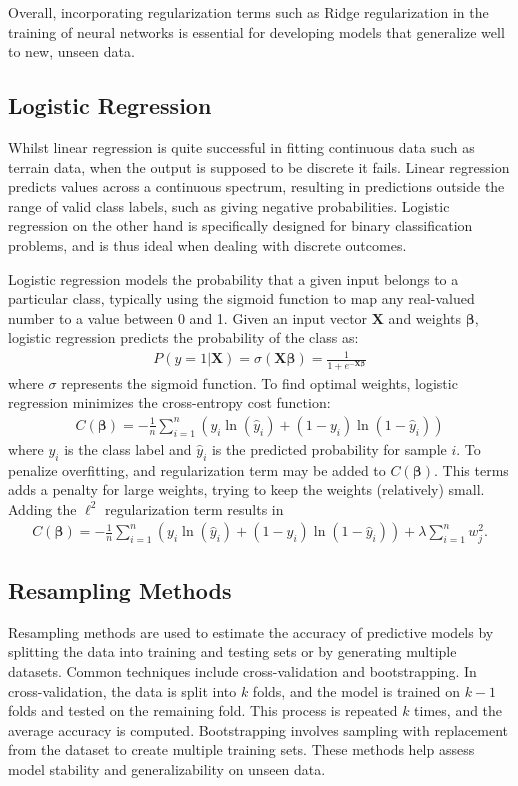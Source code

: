 \documentclass[%
reprint,
amsmath,amssymb,
aps,
]{revtex4-2}
\begin{document}
Overall, incorporating regularization terms such as Ridge regularization in the training of neural networks is essential for developing models that generalize well to new, unseen data. 


\subsection{Logistic Regression}
Whilst linear regression is quite successful in fitting continuous data such as terrain data, when the output is supposed to be discrete it fails. Linear regression predicts values across a continuous spectrum, resulting in predictions outside the range of valid class labels, such as giving negative probabilities. Logistic regression on the other hand is specifically designed for binary classification problems, and is thus ideal when dealing with discrete outcomes. 

Logistic regression models the probability that a given input belongs to a particular class, typically using the sigmoid function to map any real-valued number to a value between 0 and 1. Given an input vector $\bm X$ and weights $\bm\beta$, logistic regression predicts the probability of the class as:
\begin{align}
	P(y=1|\bm X)=\sigma(\bm X\bm\beta)=\frac{1}{1+e^{-\bm X\bm\beta}}
\end{align}
where $\sigma$ represents the sigmoid function. To find optimal weights, logistic regression minimizes the cross-entropy cost function:
\begin{align}
	C(\bm\beta)=-\frac1n\sum_{i=1}^n\left(y_i \ln(\hat y_i)+(1-y_i)\ln(1-\hat y_i) \right)
\end{align}
where $y_i$ is the class label and $\hat{y}_i$ is the predicted probability for sample $i$. To penalize overfitting, and regularization term may be added to \(C(\bm\beta)\). This terms adds a penalty for large weights, trying to keep the weights (relatively) small. Adding the \(\ell^2\) regularization term results in 
\begin{align}
	C(\bm\beta)=-\frac1n\sum_{i=1}^n\left(y_i \ln(\hat y_i)+(1-y_i)\ln(1-\hat y_i) \right) + \lambda\sum\limits_{i=1}^{n}w_{j}^{2}.
\end{align}

\subsection{Resampling Methods}
Resampling methods are used to estimate the accuracy of predictive models by splitting the data into training and testing sets or by generating multiple datasets. Common techniques include cross-validation and bootstrapping. In cross-validation, the data is split into $k$ folds, and the model is trained on $k-1$ folds and tested on the remaining fold. This process is repeated $k$ times, and the average accuracy is computed. Bootstrapping involves sampling with replacement from the dataset to create multiple training sets. These methods help assess model stability and generalizability on unseen data.
\end{document}
